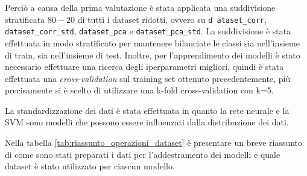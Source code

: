 Perciò a causa della prima valutazione è stata applicata una suddivisione 
stratificata $80-20$ di tutti i dataset ridotti, ovvero su 
\texttt{d ataset\_corr}, \texttt{dataset\_corr\_std}, \texttt{dataset\_pca}
e \texttt{dataset\_pca\_std}. La suddivisione è stata effettuata in modo stratificato
per mantenere bilanciate le classi sia nell'insieme di train, sia nell'insieme di test.
Inoltre, per l'apprendimento dei modelli è stato necessario effettuare una ricerca
degli iperparametri migliori, quindi è stata effettuata una \textit{cross-validation} 
sul training set ottenuto precedentemente, più precisamente si è scelto di utilizzare 
una k-fold cross-validation con k=5.

La standardizzazione dei dati è stata effettuata in quanto la rete neurale e
la SVM sono modelli che possono essere influenzati dalla distribuzione dei dati.

Nella tabella \ref{tab:riassunto_operazioni_dataset} è presentare un breve
riassunto di come sono stati preparati i dati per l'addestramento dei modelli e
quale dataset è stato utilizzato per ciascun modello.

